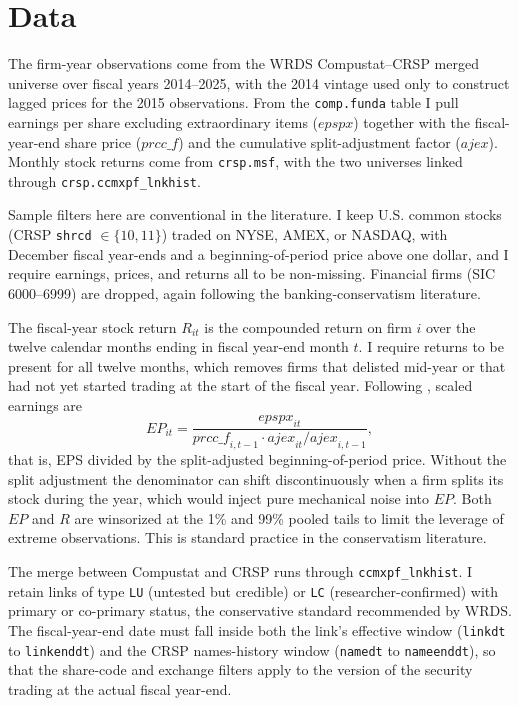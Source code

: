 \documentclass[12pt]{article}
\begin{document}
\section{Data}
\label{sec:data}
The firm-year observations come from the WRDS Compustat--CRSP merged universe over fiscal years 2014--2025, with the 2014 vintage used only to construct lagged prices for the 2015 observations. From the \texttt{comp.funda} table I pull earnings per share excluding extraordinary items ($\mathit{epspx}$) together with the fiscal-year-end share price ($\mathit{prcc\_f}$) and the cumulative split-adjustment factor ($\mathit{ajex}$). Monthly stock returns come from \texttt{crsp.msf}, with the two universes linked through \texttt{crsp.ccmxpf\_lnkhist}.

Sample filters here are conventional in the literature. I keep U.S. common stocks (CRSP \texttt{shrcd} $\in \{10, 11\}$) traded on NYSE, AMEX, or NASDAQ, with December fiscal year-ends and a beginning-of-period price above one dollar, and I require earnings, prices, and returns all to be non-missing. Financial firms (SIC 6000--6999) are dropped, again following the banking-conservatism literature.

The fiscal-year stock return $R_{it}$ is the compounded return on firm $i$ over the twelve calendar months ending in fiscal year-end month $t$. I require returns to be present for all twelve months, which removes firms that delisted mid-year or that had not yet started trading at the start of the fiscal year. Following \citet{basu1997}, scaled earnings are
\[
EP_{it} = \frac{\mathit{epspx}_{it}}{\mathit{prcc\_f}_{i,t-1} \cdot \mathit{ajex}_{it}/\mathit{ajex}_{i,t-1}},
\]
that is, EPS divided by the split-adjusted beginning-of-period price. Without the split adjustment the denominator can shift discontinuously when a firm splits its stock during the year, which would inject pure mechanical noise into $EP$. Both $EP$ and $R$ are winsorized at the 1\% and 99\% pooled tails to limit the leverage of extreme observations. This is standard practice in the conservatism literature.

The merge between Compustat and CRSP runs through \texttt{ccmxpf\_lnkhist}. I retain links of type \texttt{LU} (untested but credible) or \texttt{LC} (researcher-confirmed) with primary or co-primary status, the conservative standard recommended by WRDS. The fiscal-year-end date must fall inside both the link's effective window (\texttt{linkdt} to \texttt{linkenddt}) and the CRSP names-history window (\texttt{namedt} to \texttt{nameenddt}), so that the share-code and exchange filters apply to the version of the security trading at the actual fiscal year-end.
\end{document}
